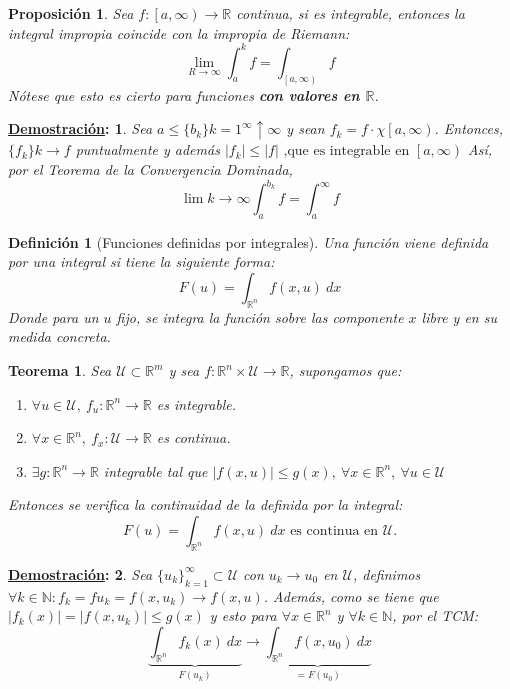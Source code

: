\documentclass[10pt,a4paper,openright]{book}
\theoremstyle{break}
\newtheorem*{defi}{Definición}
\newtheorem*{theo}{Teorema}
\newtheorem*{prop}{Proposición}
\newtheorem*{demo}{\underline{Demostración}:}
\newcommand{\dif}[1]{\ d#1}
\begin{document}
\begin{prop}
Sea $f: \left[a, \infty\right) \rightarrow \mathbb{R}$ continua, si es integrable, entonces la integral impropia coincide con la impropia de Riemann:
$$\lim_{R \rightarrow \infty} \int_a^k f = \int_{\left[a, \infty\right)} f $$
Nótese que esto es cierto para funciones \textbf{con valores en $\mathbb{R}$}.
\end{prop}

\begin{demo}
Sea $a \le \{b_k\}{k=1}^{\infty}\uparrow \infty$ y sean $f_k = f \cdot \chi{\left[a, \infty\right)}$. Entonces, $ \{f_k\}k \rightarrow f$ puntualmente y además $\vert f_k \vert \le \vert f \vert \text{ ,que es integrable en } \left[a, \infty\right)$ Así, por el Teorema de la Convergencia Dominada, $$\lim{k \rightarrow \infty} \int_a^{b_k} f = \int_a^{\infty} f$$ 
\end{demo}

\begin{defi}[Funciones definidas por integrales]
Una función viene definida por una integral si tiene la siguiente forma: 
$$F \left(u\right) = \int_{\mathbb{R}^n} f \left(x, u\right) \dif{x} $$
Donde para un $u$ fijo, se integra la función sobre las componente $x$ libre y en su medida concreta.
\end{defi}

\begin{theo}
Sea $\mathcal{U} \subset \mathbb{R}^m$ y sea $f: \mathbb{R}^n \times \mathcal{U} \rightarrow \mathbb{R}$, supongamos que: 
\begin{enumerate}
    \item $\forall u \in \mathcal{U},\ f_{u}: \mathbb{R}^n \rightarrow \mathbb{R}$ es integrable.
    \item $\forall x \in \mathbb{R}^n,\ f_x: \mathcal{U} \rightarrow \mathbb{R}$ es continua.
    \item $\exists g: \mathbb{R}^n \rightarrow \mathbb{R}$ integrable tal que $\vert f \left(x, u\right) \vert \le g \left(x\right),\ \forall x \in \mathbb{R}^n,\ \forall u \in \mathcal{U}$
\end{enumerate}
Entonces se verifica la continuidad de la definida por la integral: 
$$F \left(u\right) = \int_{\mathbb{R}^n} f \left(x, u\right) \dif{x} \text{ es continua en } \mathcal{U}.$$
\end{theo}
\begin{demo}
Sea $\{u_k\}_{k=1}^{\infty} \subset \mathcal{U}$ con $u_k \rightarrow u_0$ en $\mathcal{U}$, definimos $\forall k \in \mathbb{N}: f_k = f{u_k} = f \left(x, u_k\right) \rightarrow f \left(x, u\right)$. Además, como se tiene que $\vert f_k \left(x\right) \vert = \vert f \left(x, u_k\right) \vert \le g \left(x\right)$ y esto para $\forall x \in \mathbb{R}^n$ y $\forall k \in \mathbb{N}$, por el TCM: 
$$\underbrace{\int_{\mathbb{R}^n} f_k \left(x\right) \dif{x}}_{F \left(u_k\right)} \rightarrow \underbrace{\int_{\mathbb{R}^n} f \left(x, u_0\right) \dif{x}}_{= F \left(u_0\right)} $$
\end{demo}
\end{document}
